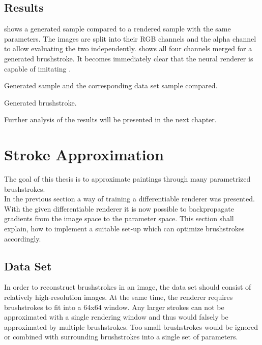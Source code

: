 \subsection{Results}
 shows a generated sample compared to a rendered sample with the same parameters.
The images are split into their RGB channels and the alpha channel to allow evaluating the two independently.
 shows all four channels merged for a generated brushstroke.
It becomes immediately clear that the neural renderer is capable of imitating .
\begin{marginfigure}
    \resizebox{\textwidth}{!}{
        
    }
    \caption[]{Generated sample and the corresponding data set sample compared.}
\end{marginfigure}
\begin{marginfigure}
    \resizebox{\textwidth}{!}{
        
    }
    \caption[]{Generated brushstroke.}
\end{marginfigure}

Further analysis of the results will be presented in the next chapter.


\section{Stroke Approximation}
The goal of this thesis is to approximate paintings through many parametrized brushstrokes. \\
In the previous section a way of training a differentiable renderer was presented.
With the given differentiable renderer it is now possible to backpropagate gradients from the image space to the parameter space.
This section shall explain, how to implement a suitable set-up which can optimize brushstrokes accordingly.


\subsection{Data Set}
In order to reconstruct brushstrokes in an image, the data set should consist of relatively high-resolution images.
At the same time, the renderer requires brushstrokes to fit into a 64x64 window.
Any larger strokes can not be approximated with a single rendering window and thus would falsely be approximated by multiple brushstrokes.
Too small brushstrokes would be ignored or combined with surrounding brushstrokes into a single set of parameters.

